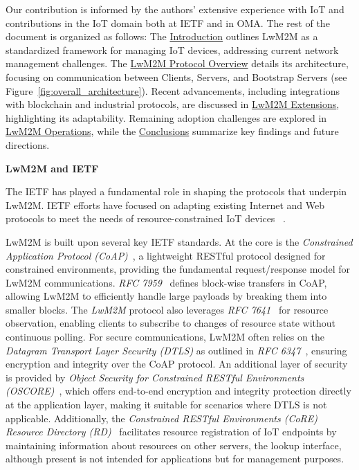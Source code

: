 \documentclass[11pt,sigconf]{iabart}
\begin{document}
Our contribution is informed by the authors' extensive experience with IoT and contributions in the IoT domain both at IETF and in OMA. The rest of the document is organized as follows: The \hyperref[introduction]{Introduction} outlines LwM2M as a standardized framework for managing IoT devices, addressing current network management challenges. The \hyperref[overview]{LwM2M Protocol Overview} details its architecture, focusing on communication between Clients, Servers, and Bootstrap Servers (see Figure~\ref{fig:overall_architecture}). Recent advancements, including integrations with blockchain and industrial protocols, are discussed in \hyperref[extensions]{LwM2M Extensions}, highlighting its adaptability. Remaining adoption challenges are explored in \hyperref[operations]{LwM2M Operations}, while the \hyperref[conclusions]{Conclusions} summarize key findings and future directions.

\textbf{LwM2M and IETF}

The IETF has played a fundamental role in shaping the protocols that underpin LwM2M. IETF efforts have focused on adapting existing Internet and Web protocols to meet the needs of resource-constrained IoT devices ~\cite{9139045}.

LwM2M is built upon several key IETF standards. At the core is the \textit{Constrained Application Protocol (CoAP)}~\cite{rfc7252}, a lightweight RESTful protocol designed for constrained environments, providing the fundamental request/response model for LwM2M communications. \textit{RFC 7959}~\cite{rfc7959} defines block-wise transfers in CoAP, allowing LwM2M to efficiently handle large payloads by breaking them into smaller blocks. The \textit{LwM2M} protocol also leverages \textit{RFC 7641}~\cite{rfc7641} for resource observation, enabling clients to subscribe to changes of resource state without continuous polling. For secure communications, LwM2M often relies on the \textit{Datagram Transport Layer Security (DTLS)} as outlined in \textit{RFC 6347}~\cite{rfc6347}, ensuring encryption and integrity over the CoAP protocol. An additional layer of security is provided by \textit{Object Security for Constrained RESTful Environments (OSCORE)}~\cite{rfc8613}, which offers end-to-end encryption and integrity protection directly at the application layer, making it suitable for scenarios where DTLS is not applicable. Additionally, the \textit{Constrained RESTful Environments (CoRE) Resource Directory (RD)}~\cite{rfc9176} facilitates resource registration of IoT endpoints by maintaining information about resources on other servers, the lookup interface, although present is not intended for applications but for management purposes.
\sloppy
\end{document}
